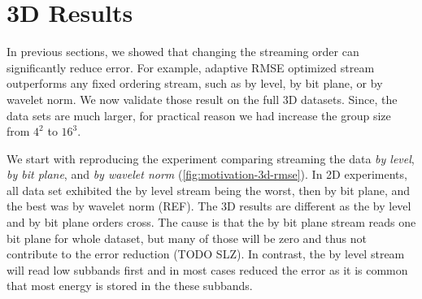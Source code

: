 \iffalse %
\section{3D Results}
\label{sec:3d_results}

In previous sections, we showed that changing the streaming order can significantly reduce error.
For example, adaptive RMSE optimized stream outperforms any fixed ordering stream, such as by level,
by bit plane, or by wavelet norm. We now validate those result on the full 3D datasets. Since, the
data sets are much larger, for practical reason we had increase the group size from \(4^2\) to
\(16^3\).

We start with reproducing the experiment comparing streaming the data \emph{by level}, \emph{by bit
plane}, and \emph{by wavelet norm} (\autoref{fig:motivation-3d-rmse}). In 2D experiments, all data
set exhibited the by level stream being the worst, then by bit plane, and the best was by wavelet
norm (REF). The 3D results are different as the by level and by bit plane orders cross. The cause is
that the by bit plane stream reads one bit plane for whole dataset, but many of those will be zero
and thus not contribute to the error reduction (TODO SLZ). In contrast, the by level stream will
read low subbands first and in most cases reduced the error as it is common that most energy is
stored in the these subbands.

